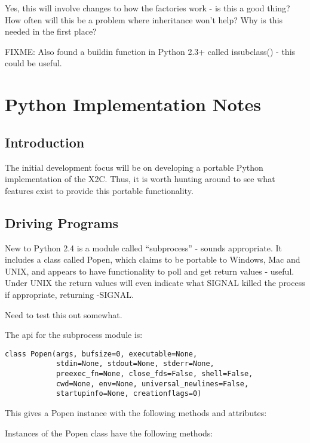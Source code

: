 \documentclass[a4paper, 11pt]{article}
\begin{document}
Yes, this will involve changes to how the factories work - is this a
good thing? How often will this be a problem where inheritance won't help?
Why is this needed in the first place?

FIXME: Also found a buildin function in Python 2.3+ called issubclass() - 
this could be useful.

\section{Python Implementation Notes}

\subsection{Introduction}

The initial development focus will be on developing a portable Python 
implementation of the X2C. Thus, it is worth hunting around to see what 
features exist to provide this portable functionality. 

\subsection{Driving Programs}

New to Python 2.4 is a module called ``subprocess'' - sounds appropriate. 
It includes a class called Popen, which claims to be portable to Windows,
Mac and UNIX, and appears to have functionality to poll and get return 
values - useful. Under UNIX the return values will even indicate what
SIGNAL killed the process if appropriate, returning -SIGNAL.

Need to test this out somewhat.

The api for the subprocess module is:

\begin{verbatim}
class Popen(args, bufsize=0, executable=None, 
            stdin=None, stdout=None, stderr=None, 
            preexec_fn=None, close_fds=False, shell=False, 
            cwd=None, env=None, universal_newlines=False, 
            startupinfo=None, creationflags=0)
\end{verbatim}

This gives a Popen instance with the following methods and attributes:

Instances of the Popen class have the following methods:
\end{document}

